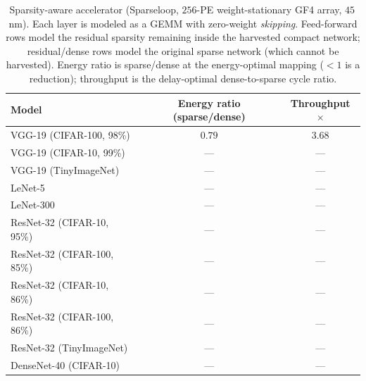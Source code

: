 \begin{table}[t]
  \centering
  \small
  \caption{Sparsity-aware accelerator (Sparseloop, $256$-PE weight-stationary
    GF4 array, $45$\,nm). Each layer is modeled as a GEMM with zero-weight
    \emph{skipping}. Feed-forward rows model the residual sparsity remaining inside
    the harvested compact network; residual/dense rows model the original sparse
    network (which cannot be harvested). Energy ratio is sparse/dense at the
    energy-optimal mapping ($<1$ is a reduction); throughput is the delay-optimal
    dense-to-sparse cycle ratio.}
  \label{tab:sparseloop}
  \begin{tabular}{l c c}
    \toprule
    Model & Energy ratio (sparse/dense) & Throughput $\times$ \\
    \midrule
    VGG-19 (CIFAR-100, 98\%)  & $0.79$ & $3.68$ \\
    VGG-19 (CIFAR-10, 99\%)   & ---    & ---    \\
    VGG-19 (TinyImageNet)     & ---    & ---    \\
    LeNet-5                   & ---    & ---    \\
    LeNet-300                 & ---    & ---    \\
    \midrule
    ResNet-32 (CIFAR-10, 95\%)   & ---    & ---    \\
    ResNet-32 (CIFAR-100, 85\%)  & ---    & ---    \\
    ResNet-32 (CIFAR-10, 86\%)   & ---    & ---    \\
    ResNet-32 (CIFAR-100, 86\%)  & ---    & ---    \\
    ResNet-32 (TinyImageNet)     & ---    & ---    \\
    DenseNet-40 (CIFAR-10)       & ---    & ---    \\
    \bottomrule
  \end{tabular}
\end{table}
